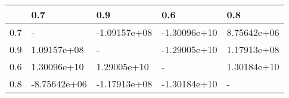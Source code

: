 \begin{tabular}{lllll}
\toprule
{} &          0.7 &          0.9 &          0.6 &          0.8 \\
\midrule
0.7 &            - & -1.09157e+08 & -1.30096e+10 &  8.75642e+06 \\
0.9 &  1.09157e+08 &            - & -1.29005e+10 &  1.17913e+08 \\
0.6 &  1.30096e+10 &  1.29005e+10 &            - &  1.30184e+10 \\
0.8 & -8.75642e+06 & -1.17913e+08 & -1.30184e+10 &            - \\
\bottomrule
\end{tabular}
